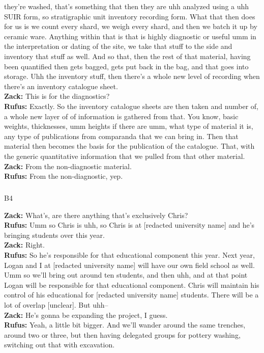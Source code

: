 \documentclass[
  canadian,
]{article}
\makeatletter
\let\oldsubparagraph\subparagraph
\renewcommand{\subparagraph}{
    \@ifstar
      \xxxSubParagraphStar
      \xxxSubParagraphNoStar
  }
\newcommand{\xxxSubParagraphStar}[1]{\oldsubparagraph*{#1}\mbox{}}
\newcommand{\xxxSubParagraphNoStar}[1]{\oldsubparagraph{#1}\mbox{}}
\makeatother
\begin{document}
they're washed, that's something that then they are uhh analyzed using a
uhh SUIR form, so stratigraphic unit inventory recording form. What that
then does for us is we count every shard, we weigh every shard, and then
we batch it up by ceramic ware. Anything within that is that is highly
diagnostic or useful umm in the interpretation or dating of the site, we
take that stuff to the side and inventory that stuff as well. And so
that, then the rest of that material, having been quantified then gets
bagged, gets put back in the bag, and that goes into storage. Uhh the
inventory stuff, then there's a whole new level of recording when
there's an inventory catalogue sheet.\\
\textbf{Zack:} This is for the diagnostics?\\
\textbf{Rufus:} Exactly. So the inventory catalogue sheets are then
taken and number of, a whole new layer of of information is gathered
from that. You know, basic weights, thicknesses, umm heights if there
are umm, what type of material it is, any type of publications from
comparanda that we can bring in. Then that material then becomes the
basis for the publication of the catalogue. That, with the generic
quantitative information that we pulled from that other material.\\
\textbf{Zack:} From the non-diagnostic material.\\
\textbf{Rufus:} From the non-diagnostic, yep.

\subparagraph{B4}\label{sec-B4}

\textbf{Zack:} What's, are there anything that's exclusively Chris?\\
\textbf{Rufus:} Umm so Chris is uhh, so Chris is at {[}redacted
university name{]} and he's bringing students over this year.\\
\textbf{Zack:} Right.\\
\textbf{Rufus:} So he's responsible for that educational component this
year. Next year, Logan and I at {[}redacted university name{]} will have
our own field school as well. Umm so we'll bring out around ten
students, and then uhh, and at that point Logan will be responsible for
that educational component. Chris will maintain his control of his
educational for {[}redacted university name{]} students. There will be a
lot of overlap {[}unclear{]}. But uhh--\\
\textbf{Zack:} He's gonna be expanding the project, I guess.\\
\textbf{Rufus:} Yeah, a little bit bigger. And we'll wander around the
same trenches, around two or three, but then having delegated groups for
pottery washing, switching out that with excavation.
\end{document}
